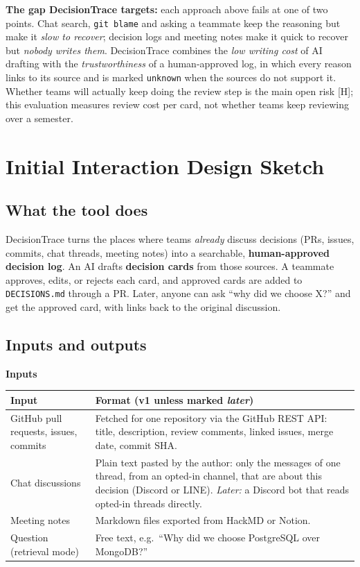 \documentclass[11pt,a4paper]{article}
\newcommand{\code}[1]{\texttt{#1}}
\begin{document}
\textbf{The gap DecisionTrace targets:} each approach above fails at one of two points. Chat search, \code{git blame} and asking a teammate keep the reasoning but make it \emph{slow to recover}; decision logs and meeting notes make it quick to recover but \emph{nobody writes them}. DecisionTrace combines the \emph{low writing cost} of AI drafting with the \emph{trustworthiness} of a human-approved log, in which every reason links to its source and is marked \code{unknown} when the sources do not support it. Whether teams will actually keep doing the review step is the main open risk [H]; this evaluation measures review cost per card, not whether teams keep reviewing over a semester.

\section{Initial Interaction Design Sketch}\label{sec:design}

\subsection{What the tool does}

DecisionTrace turns the places where teams \emph{already} discuss decisions (PRs, issues, commits, chat threads, meeting notes) into a searchable, \textbf{human-approved decision log}. An AI drafts \textbf{decision cards} from those sources. A teammate approves, edits, or rejects each card, and approved cards are added to \code{DECISIONS.md} through a PR. Later, anyone can ask ``why did we choose X?'' and get the approved card, with links back to the original discussion.

\subsection{Inputs and outputs}

\textbf{Inputs}

{\small
\begin{tabularx}{\linewidth}{@{}>{\raggedright\arraybackslash}p{4.2cm}L@{}}
\toprule
\textbf{Input} & \textbf{Format (v1 unless marked \emph{later})}\\
\midrule
GitHub pull requests, issues, commits & Fetched for one repository via the GitHub REST API: title, description, review comments, linked issues, merge date, commit SHA.\\
Chat discussions & Plain text pasted by the author: only the messages of one thread, from an opted-in channel, that are about this decision (Discord or LINE). \emph{Later:} a Discord bot that reads opted-in threads directly.\\
Meeting notes & Markdown files exported from HackMD or Notion.\\
Question (retrieval mode) & Free text, e.g.\ ``Why did we choose PostgreSQL over MongoDB?''\\
\bottomrule
\end{tabularx}
}
\end{document}
